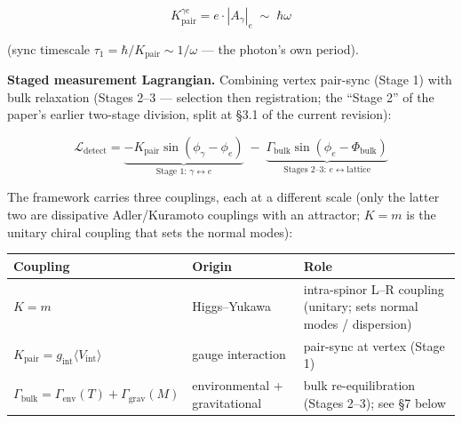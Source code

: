 \documentclass[
]{article}
\newcounter{none} %
\begin{document}
\[K_{\text{pair}}^{\gamma e} = e \cdot |A_\gamma|_e \;\sim\; \hbar\omega\]

(sync timescale \(\tau_1 = \hbar/K_{\text{pair}} \sim 1/\omega\) --- the
photon's own period).

\textbf{Staged measurement Lagrangian.} Combining vertex pair-sync
(Stage 1) with bulk relaxation (Stages 2--3 --- selection then
registration; the ``Stage 2'' of the paper's earlier two-stage division,
split at §3.1 of the current revision):

\[\mathcal{L}_{\text{detect}} = \underbrace{-K_{\text{pair}}\sin(\phi_\gamma - \phi_e)}_{\text{Stage 1: }\gamma\leftrightarrow e} \;-\; \underbrace{\Gamma_{\text{bulk}}\sin(\phi_e - \Phi_{\text{bulk}})}_{\text{Stages 2–3: }e\leftrightarrow\text{lattice}}\]

The framework carries three couplings, each at a different scale (only
the latter two are dissipative Adler/Kuramoto couplings with an
attractor; \(K = m\) is the unitary chiral coupling that sets the normal
modes):

{\def\LTcaptype{none} %
\begin{longtable}[]{@{}
  >{\raggedright\arraybackslash}p{}
  >{\raggedright\arraybackslash}p{}
  >{\raggedright\arraybackslash}p{}@{}}
\toprule\noalign{}
\begin{minipage}[b]{\linewidth}\raggedright
Coupling
\end{minipage} & \begin{minipage}[b]{\linewidth}\raggedright
Origin
\end{minipage} & \begin{minipage}[b]{\linewidth}\raggedright
Role
\end{minipage} \\
\midrule\noalign{}
\endhead
\bottomrule\noalign{}
\endlastfoot
\(K = m\) & Higgs--Yukawa & intra-spinor L--R coupling (unitary; sets
normal modes / dispersion) \\
\(K_{\text{pair}} = g_{\text{int}}\langle V_{\text{int}}\rangle\) &
gauge interaction & pair-sync at vertex (Stage 1) \\
\(\Gamma_{\text{bulk}} = \Gamma_{\text{env}}(T) + \Gamma_{\text{grav}}(M)\)
& environmental + gravitational & bulk re-equilibration (Stages 2--3);
see §7 below \\
\end{longtable}
}
\end{document}

